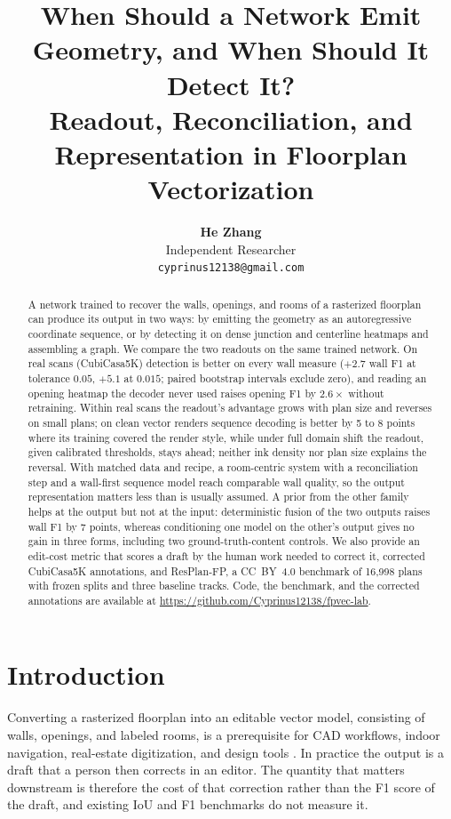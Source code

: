 \documentclass{article}
\title{When Should a Network Emit Geometry, and When Should It Detect It?\\
Readout, Reconciliation, and Representation in Floorplan Vectorization}
\author{%
  \textbf{He Zhang} \\
  Independent Researcher \\
  \texttt{cyprinus12138@gmail.com} \\
}
\begin{document}
\maketitle

\begin{abstract}
A network trained to recover the walls, openings, and rooms of a rasterized
floorplan can produce its output in two ways: by emitting the geometry as an
autoregressive coordinate sequence, or by detecting it on dense junction and
centerline heatmaps and assembling a graph. We compare the two readouts on the
same trained network. On real scans (CubiCasa5K) detection is better on every
wall measure ($+2.7$ wall F1 at tolerance $0.05$, $+5.1$ at $0.015$; paired
bootstrap intervals exclude zero), and reading an opening heatmap the decoder
never used raises opening F1 by $2.6\times$ without retraining. Within real
scans the readout's advantage grows with plan size and reverses on small
plans; on clean vector renders sequence decoding is better by 5 to 8 points
where its training covered the render style, while under full domain shift
the readout, given calibrated thresholds, stays ahead; neither ink density
nor plan size explains the reversal. With matched data and recipe, a room-centric system
with a reconciliation step and a wall-first sequence model reach comparable
wall quality, so the output representation matters less than is usually
assumed. A prior from the other family helps at the output but not at the
input: deterministic fusion of the two outputs raises wall F1 by $7$ points,
whereas conditioning one model on the other's output gives no gain in three
forms, including two ground-truth-content controls. We also provide an
edit-cost metric that scores a draft by the human work needed to correct it,
corrected CubiCasa5K annotations, and ResPlan-FP, a CC~BY~4.0 benchmark of
16{,}998 plans with frozen splits and three baseline tracks. Code, the
benchmark, and the corrected annotations are available at
\url{https://github.com/Cyprinus12138/fpvec-lab}.
\end{abstract}

\section{Introduction}
Converting a rasterized floorplan into an editable vector model, consisting of
walls, openings, and labeled rooms, is a prerequisite for CAD workflows, indoor
navigation, real-estate digitization, and design tools
\citep{liu2017raster,kalervo2019cubicasa,zeng2019deepfloorplan}. In practice the
output is a draft that a person then corrects in an editor. The quantity that
matters downstream is therefore the cost of that correction rather than the F1
score of the draft, and existing IoU and F1 benchmarks do not measure it.
\end{document}

